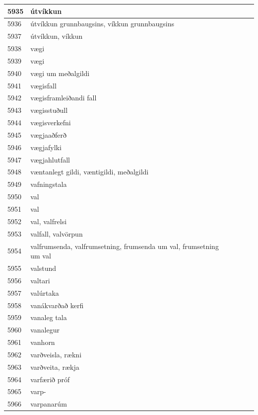 \begin{longtable}{p{}|p{}|p{}|p{}|p{}}
5935 & útvíkkun &  &  &  \\
\hline
5936 & útvíkkun grunnbaugsins, víkkun grunnbaugsins &  &  &  \\
\hline
5937 & útvíkkun, víkkun &  &  &  \\
\hline
5938 & vægi &  &  &  \\
\hline
5939 & vægi &  &  &  \\
\hline
5940 & vægi um meðalgildi &  &  &  \\
\hline
5941 & vægisfall &  &  &  \\
\hline
5942 & vægisframleiðandi fall &  &  &  \\
\hline
5943 & vægisstuðull &  &  &  \\
\hline
5944 & vægisverkefni &  &  &  \\
\hline
5945 & vægjaaðferð &  &  &  \\
\hline
5946 & vægjafylki &  &  &  \\
\hline
5947 & vægjahlutfall &  &  &  \\
\hline
5948 & væntanlegt gildi, væntigildi, meðalgildi &  &  &  \\
\hline
5949 & vafningstala &  &  &  \\
\hline
5950 & val &  &  &  \\
\hline
5951 & val &  &  &  \\
\hline
5952 & val, valfrelsi &  &  &  \\
\hline
5953 & valfall, valvörpun &  &  &  \\
\hline
5954 & valfrumsenda, valfrumsetning, frumsenda um val, frumsetning um val &  &  &  \\
\hline
5955 & valstund &  &  &  \\
\hline
5956 & valtari &  &  &  \\
\hline
5957 & valúrtaka &  &  &  \\
\hline
5958 & vanákvarðað kerfi &  &  &  \\
\hline
5959 & vanaleg tala &  &  &  \\
\hline
5960 & vanalegur &  &  &  \\
\hline
5961 & vanhorn &  &  &  \\
\hline
5962 & varðveisla, rækni &  &  &  \\
\hline
5963 & varðveita, rækja &  &  &  \\
\hline
5964 & varfærið próf &  &  &  \\
\hline
5965 & varp- &  &  &  \\
\hline
5966 & varpanarúm &  &  &  \\

\end{longtable}
